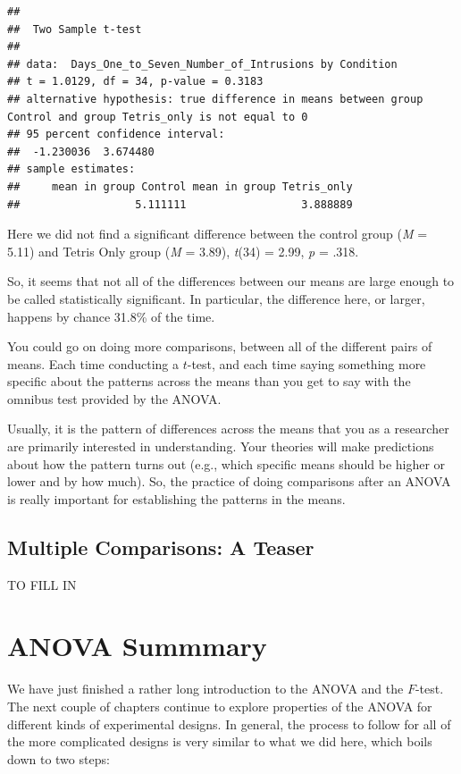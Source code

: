 \documentclass[
]{book}
\begin{document}
\begin{verbatim}
## 
##  Two Sample t-test
## 
## data:  Days_One_to_Seven_Number_of_Intrusions by Condition
## t = 1.0129, df = 34, p-value = 0.3183
## alternative hypothesis: true difference in means between group Control and group Tetris_only is not equal to 0
## 95 percent confidence interval:
##  -1.230036  3.674480
## sample estimates:
##     mean in group Control mean in group Tetris_only 
##                  5.111111                  3.888889
\end{verbatim}

Here we did not find a significant difference between the control group (\emph{M} = 5.11) and Tetris Only group (\emph{M} = 3.89), \emph{t}(34) = 2.99, \emph{p} = .318.

So, it seems that not all of the differences between our means are large enough to be called statistically significant. In particular, the difference here, or larger, happens by chance 31.8\% of the time.

You could go on doing more comparisons, between all of the different pairs of means. Each time conducting a \(t\)-test, and each time saying something more specific about the patterns across the means than you get to say with the omnibus test provided by the ANOVA.

Usually, it is the pattern of differences across the means that you as a researcher are primarily interested in understanding. Your theories will make predictions about how the pattern turns out (e.g., which specific means should be higher or lower and by how much). So, the practice of doing comparisons after an ANOVA is really important for establishing the patterns in the means.

\subsection{Multiple Comparisons: A Teaser}\label{multiple-comparisons-a-teaser}

TO FILL IN

\section{ANOVA Summmary}\label{anova-summmary}

We have just finished a rather long introduction to the ANOVA and the \(F\)-test. The next couple of chapters continue to explore properties of the ANOVA for different kinds of experimental designs. In general, the process to follow for all of the more complicated designs is very similar to what we did here, which boils down to two steps:
\end{document}
